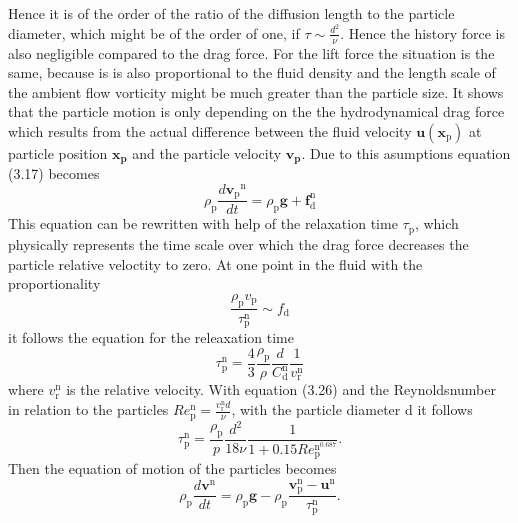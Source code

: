 \documentclass[11pt,a4paper,openany,oneside,parskip=half*]{article}
\renewcommand*\vec[1]{\boldsymbol{#1}}
\begin{document}
Hence it is of the order of the ratio of the diffusion length to the particle diameter, which might be of the order of one, if $\tau \sim \frac{d^\mathrm{2}}{\nu}$.
Hence the history force is also negligible compared to the drag force.
For the lift force the situation is the same, because is is also proportional to the fluid density and the length scale of the ambient flow vorticity might be much greater than the particle size.
It shows that the particle motion is only depending on the the hydrodynamical drag force which results from the actual difference between the fluid velocity $\vec{u}(\vec{x}_\mathrm{p})$ at particle position $\vec{x_p}$ and the particle velocity $\vec{v_p}$.
Due to this asumptions equation (3.17) becomes
\begin{equation}
\rho_\mathrm{p}\frac{d\vec{v_\mathrm{p}}^\mathrm{n}}{dt} = \rho_\mathrm{p}\vec{g}+\vec{f}_\mathrm{d}^\mathrm{n}
\end{equation}
This equation can be rewritten with help of the relaxation time $\tau_\mathrm{p}$, which physically represents the time scale over which the drag force decreases the particle relative veloctity to zero. At one point in the fluid with the proportionality 
\begin{equation}
\frac{\rho_\mathrm{p} v_\mathrm{p}}{\tau_\mathrm{p}^\mathrm{n}} \sim f_\mathrm{d}
\end{equation} it follows the equation for the releaxation time
\begin{equation}
\tau_\mathrm{p}^\mathrm{n} = \frac{4}{3}\frac{\rho_\mathrm{p}}{\rho} \frac{d}{C_\mathrm{d}^\mathrm{n}}\frac{1}{v_\mathrm{r}^\mathrm{n}}
\end{equation}
where $v_\mathrm{r}^\mathrm{n}$ is the relative velocity. 
With equation (3.26) and the Reynoldsnumber in relation to the particles $Re_\mathrm{p}^\mathrm{n}=\frac{v_\mathrm{r}^\mathrm{n}d}{\nu}$, with the particle diameter d it follows
\begin{equation}
\tau_\mathrm{p}^\mathrm{n} = \frac{\rho_\mathrm{p}}{p}\frac{d^2}{18\nu}\frac{1}{1+0.15Re_\mathrm{p}^\mathrm{n^\mathrm{0.687}}}.
\end{equation} 
Then the equation of motion of the particles becomes
\begin{equation}
\rho_\mathrm{p}\frac{d\vec{v}^\mathrm{n}}{dt} = \rho_\mathrm{p}\vec{g}-\rho_\mathrm{p}\frac{\vec{v}_\mathrm{p}^\mathrm{n}-\vec{u}^\mathrm{n}}{\tau_\mathrm{p}^\mathrm{n}}.
\end{equation}
\end{document}
